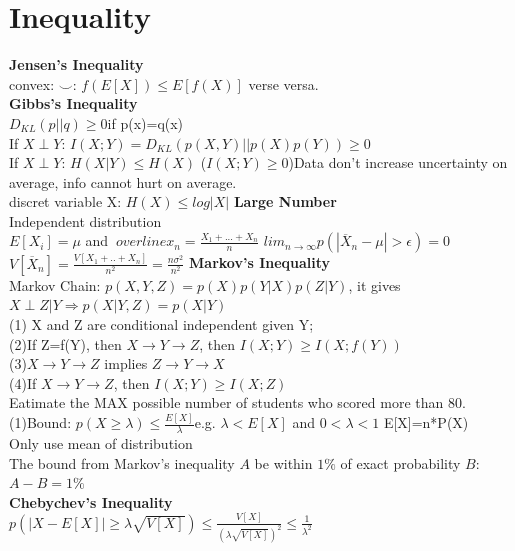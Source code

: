 \documentclass[12pt,a4paper]{extarticle}
\begin{document}
\section{Inequality}
\textbf{Jensen's Inequality}\\
convex: $\smile$: $f(E[X])\leq E[f(X)]$ verse versa.\\
\newline
\textbf{Gibbs's Inequality}\\
$D_{KL}(p||q)\geq 0$if p(x)=q(x)\\
If $X\perp Y$: $I(X;Y)=D_{KL}(p(X,Y)||p(X)p(Y))\geq 0$\\
If $X\perp Y$: $H(X|Y)\leq H(X)$ ($I(X;Y)\geq 0$)Data don't increase uncertainty on average, info cannot hurt on average.\\
discret variable X: $H(X)\leq log|X|$
\newline
\textbf{Large Number}\\
Independent distribution\\
$E[X_i]=\mu$ and $\ overline{x}_n=\frac{X_1+...+X_n}{n}$ $lim_{n\to\infty}p(|\overline{X}_n-\mu|>\epsilon)=0$\\
$V[\overline{X}_n]=\frac{V[X_1+..+X_n]}{n^2}=\frac{n\sigma^2}{n^2}$
\newline
\textbf{Markov's Inequality}\\
Markov Chain: $p(X,Y,Z)=p(X)p(Y|X)p(Z|Y)$, it gives $X\perp Z|Y \Rightarrow p(X|Y,Z)=p(X|Y)$\\ 
(1) X and Z are conditional independent given Y;\\
(2)If Z=f(Y), then $X\to Y\to Z$, then $I(X;Y)\geq I(X;f(Y))$\\
(3)$X\to Y\to Z$ implies $Z\to Y\to X$\\
(4)If $X\to Y\to Z$, then $I(X;Y)\geq I(X;Z)$\\
Eatimate the MAX possible number of students who scored more than 80.\\
(1)Bound: $p(X\geq \lambda)\leq \frac{E[X]}{\lambda}$e.g. $\lambda < E[X]$ and $0<\lambda <1$ E[X]=n*P(X)\\
Only use mean of distribution\\
The bound from Markov's inequality $A$ be within $1\%$ of exact probability $B$:
$A-B=1\%$\\
\newline
\textbf{Chebychev's Inequality}\\
$p(|X-E[X]|\geq \lambda \sqrt{V[X]})\leq \frac{V[X]}{(\lambda \sqrt{V[X]})^2} \leq \frac{1}{\lambda^2}$\\
\end{document}
